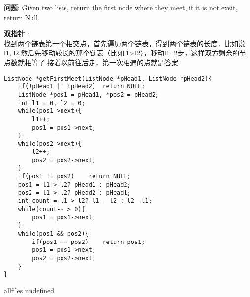 \documentclass{article}
\begin{document}
\begin{CJK}{UTF8}{gbsn}     %

\else
    
\begin{description}
    \item{\textbf{问题}}: Given two lists, return the first node where they meet, if it is not exsit, return Null.
    \item{\textbf{双指针}} : 
    \\找到两个链表第一个相交点，首先遍历两个链表，得到两个链表的长度，比如说l1, l2.然后先移动较长的那个链表（比如l1>l2），移动l1-l2步，这样双方剩余的节点数就相等了.接着以前往后走，第一次相遇的点就是答案
    \begin{lstlisting}
ListNode *getFirstMeet(ListNode *pHead1, ListNode *pHead2){
	if(!pHead1 || !pHead2)	return NULL;
	ListNode *pos1 = pHead1, *pos2 = pHead2;
	int l1 = 0, l2 = 0;
	while(pos1->next){
		l1++;
		pos1 = pos1->next;
	}
	while(pos2->next){
		l2++;
		pos2 = pos2->next;
	}
	if(pos1 != pos2)	return NULL;
	pos1 = l1 > l2? pHead1 : pHead2;
	pos2 = l1 > l2? pHead2 : pHead1;
	int count = l1 > l2? l1 - l2 : l2 -l1;
	while(count-- > 0){
		pos1 = pos1->next;
	}
	while(pos1 && pos2){
		if(pos1 == pos2)	return pos1;
		pos1 = pos1->next;
		pos2 = pos2->next;
	}
}
    \end{lstlisting}
\end{description}

\fi

\ifx allfiles undefined
\end{CJK}
\end{document}
